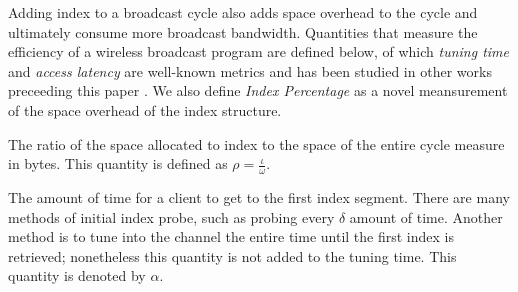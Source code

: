 \documentclass{sig-alternate}
\newenvironment{definition}[1][Definition]{\begin{trivlist}
\item[\hskip \labelsep {\bfseries #1}]}{\end{trivlist}}
\begin{document}

Adding index to a broadcast cycle also adds space overhead to the cycle
and ultimately consume more broadcast bandwidth. Quantities that measure
the efficiency of a wireless broadcast program are defined below, of which
\emph{tuning time} and \emph{access latency} are well-known metrics and has
been studied in other works preceeding this paper \cite{dsi} \cite{data_on_air}
\cite{DBLP:journals/tmc/KuZW08} \cite{signature_and_caching}. We also
define \emph{Index Percentage} as a novel meansurement of the space
overhead of the index structure.

\begin{definition}[Index Percentage]\label{def:index_percentage}
The ratio of the space allocated to index to the space of the entire
cycle measure in bytes. This quantity is defined as
$\rho = \frac{\iota}{\omega}$.
\end{definition}

\begin{definition}[Initial Index Probe]\label{def:index_probe}
The amount of time for a client to get to the first index segment. There
are many methods of initial index probe, such as probing every $\delta$
amount of time. Another method is to tune into the
channel the entire time until the first index is retrieved; nonetheless
this quantity is not added to the tuning time. This quantity is denoted
by $\alpha$.
\end{definition}
\end{document}
